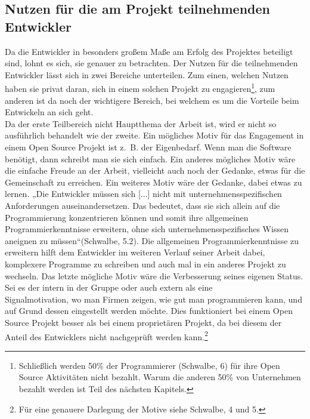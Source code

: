 \documentclass[a4paper,12pt]{article}
\begin{document}
\subsection{Nutzen für die am Projekt teilnehmenden Entwickler}
Da die Entwickler in besonders großem Maße am Erfolg des Projektes beteiligt sind, lohnt es sich, sie genauer zu betrachten. Der Nutzen für die teilnehmenden Entwickler lässt sich in zwei Bereiche unterteilen. Zum einen, welchen Nutzen haben sie privat daran, sich in einem solchen Projekt zu engagieren\footnote{Schließlich werden 50\% der Programmierer (Schwalbe, 6) für ihre Open Source Aktivitäten nicht bezahlt. Warum die anderen 50\% von Unternehmen bezahlt werden ist Teil des nächsten Kapitels.}, zum anderen ist da noch der wichtigere Bereich, bei welchem es um die Vorteile beim Entwickeln an sich geht.\\
Da der erste Teilbereich nicht Hauptthema der Arbeit ist, wird er nicht so ausführlich behandelt wie der zweite. Ein mögliches Motiv für das Engagement in einem Open Source Projekt ist z.~B. der Eigenbedarf. Wenn man die Software benötigt, dann schreibt man sie sich einfach. Ein anderes mögliches Motiv wäre die einfache Freude an der Arbeit, vielleicht auch noch der Gedanke, etwas für die Gemeinschaft zu erreichen. Ein weiteres Motiv wäre der Gedanke, dabei etwas zu lernen. „Die Entwickler müssen sich [...] nicht mit unternehmensspezifischen Anforderungen auseinandersetzen. Das bedeutet, dass sie sich allein auf die Programmierung konzentrieren können und somit ihre allgemeinen Programmierkenntnisse erweitern, ohne sich unternehmensspezifisches Wissen aneignen zu müssen“(Schwalbe, 5.2). Die allgemeinen Programmierkenntnisse zu erweitern hilft dem Entwickler im weiteren Verlauf seiner Arbeit dabei, komplexere Programme zu schreiben und auch mal in ein anderes Projekt zu wechseln. Das letzte mögliche Motiv wäre die Verbesserung seines eigenen Status. Sei es der intern in der Gruppe oder auch extern als eine\\ Signalmotivation, wo man Firmen zeigen, wie gut man programmieren kann, und auf Grund dessen eingestellt werden möchte. Dies funktioniert bei einem Open Source Projekt besser als bei einem proprietären Projekt, da bei diesem der Anteil des Entwicklers nicht nachgeprüft werden kann.\footnote{Für eine genauere Darlegung der Motive siehe Schwalbe, 4 und 5.}\\
\end{document}
